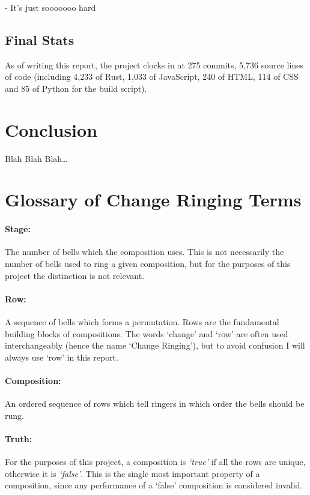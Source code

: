 \documentclass[12pt]{article}
\begin{document}
- It's just sooooooo hard

\subsection{Final Stats}

As of writing this report, the project clocks in at 275 commits, 5,736 source lines of code
(including 4,233 of Rust, 1,033 of JavaScript, 240 of HTML, 114 of CSS and 85 of Python for the
build script).



\pagebreak

\section{Conclusion}

Blah Blah Blah\ldots



\pagebreak

\section{Glossary of Change Ringing Terms}

\paragraph{Stage:} The number of bells which the composition uses.  This is not necessarily the
number of bells used to ring a given composition, but for the purposes of this project the
distinction is not relevant.

\paragraph{Row:} A sequence of bells which forms a permutation.  Rows are the fundamental building
blocks of compositions.  The words `change' and `row' are often used interchangeably (hence the name
`Change Ringing'), but to avoid confusion I will always use `row' in this report.

\paragraph{Composition:} An ordered sequence of rows which tell ringers in which order the bells
should be rung.

\paragraph{Truth:} For the purposes of this project, a composition is \emph{`true'} if all the rows
are unique, otherwise it is \emph{`false'}.  This is the single most important property of a
composition, since any performance of a `false' composition is considered invalid.
\end{document}
